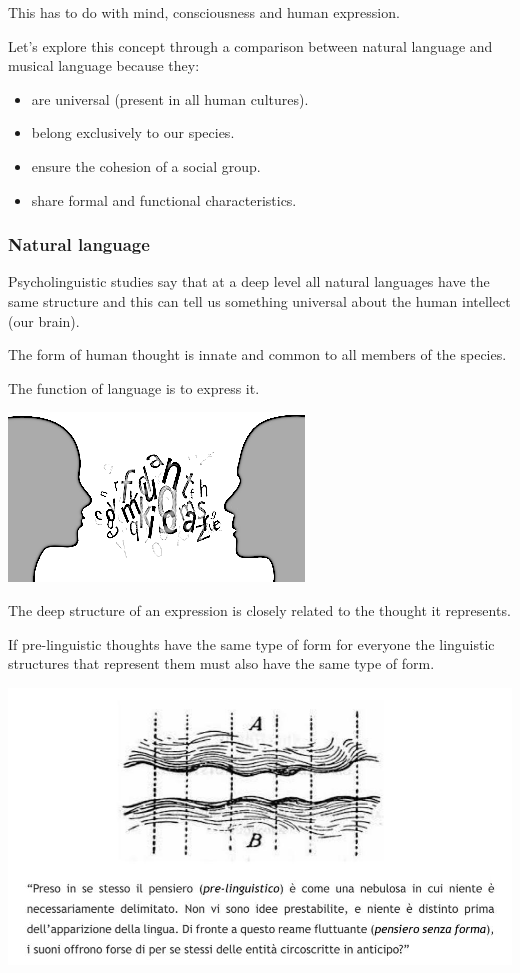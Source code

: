 This has to do with mind, consciousness and human expression.

Let's explore this concept through a comparison between natural language and musical language because they: 
\begin{itemize}
\item are universal (present in all human cultures). 
\item belong exclusively to our species. 
\item ensure the cohesion of a social group. 
\item share formal and functional characteristics.
\end{itemize}

\subsubsection{Natural language}\label{natural-language}

Psycholinguistic studies say that at a deep level all natural languages have the same structure and this can tell us something universal about the human intellect (our brain).

The form of human thought is innate and common to all members of the species.

The function of language is to express it.

\begin{center}
\includegraphics[scale=0.4]{../img/linguaggio.png}
\end{center}

The deep structure of an expression is closely related to the thought it represents.

If pre-linguistic thoughts have the same type of form for everyone the linguistic structures that represent them must also have the same type of form.

\begin{center}
\includegraphics[scale=0.8]{../img/prelinguistico.png}
\end{center}

